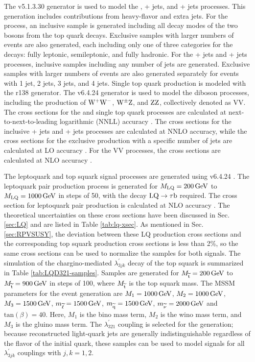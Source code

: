The \MADGRAPH v5.1.3.30 generator \cite{MadGraph} is used to model the \ttbar, \W + jets, and \Z + jets processes. This generation includes contributions from heavy-flavor and extra jets. For the \ttbar process, an inclusive sample is generated including all decay modes of the two \W bosons from the top quark decays. Exclusive samples with larger numbers of events are also generated, each including only one of three categories for the \W decays: fully leptonic, semileptonic, and fully hadronic. For the \W + jets and \Z + jets processes, inclusive samples including any number of jets are generated. Exclusive samples with larger numbers of events are also generated separately for events with 1 jet, 2 jets, 3 jets, and 4 jets. Single top quark production is modeled with the  r138 \cite{POWHEG2,POWHEG:singlet,POWHEG:singletW} generator. The \PYTHIA v6.4.24 generator \cite{Sjostrand:2006za} is used to model the diboson processes, including the production of $\mathrm{W}^{+}\mathrm{W}^{-}$, $\mathrm{W}^{\pm}\mathrm{Z}$, and $\mathrm{Z}\mathrm{Z}$, collectively denoted as VV. The cross sections for the \ttbar and single top quark processes are calculated at next-to-next-to-leading logarithmic (NNLL) accuracy \cite{TOPCrossSec}. The cross sections for the inclusive \W + jets and \Z + jets processes are calculated at NNLO accuracy, while the cross sections for the exclusive production with a specific number of jets are calculated at LO accuracy \cite{FEWZ}. For the VV processes, the cross sections are calculated at NLO accuracy \cite{MCFM}.

The leptoquark and top squark signal processes are generated using \PYTHIA v6.4.24 \cite{Sjostrand:2006za}. The leptoquark pair production process is generated for $M_{\text{LQ}}=200\,\text{Ge\hspace{-.08em}V}$ to $M_{\text{LQ}}=1000\,\text{Ge\hspace{-.08em}V}$ in steps of 50\GeV, with the decay $\text{LQ} \rightarrow \tau \mathrm{b}$ required. The cross section for leptoquark pair production is calculated at NLO accuracy \cite{LQxsec}. The theoretical uncertainties on these cross sections have been discussed in Sec. \ref{sec:LQ} and are listed in Table \ref{tab:lq-xsec}. As mentioned in Sec. \ref{sec:RPVSUSY}, the deviation between these LQ production cross sections and the corresponding top squark production cross sections is less than 2\%, so the same cross sections can be used to normalize the samples for both signals. The simulation of the chargino-mediated $\lambda_{3jk}^{\prime}$ decay of the top squark is summarized in Table \ref{tab:LQD321-samples}. Samples are generated for $M_{\widetilde{\mathrm{t}}}=200\,\text{Ge\hspace{-.08em}V}$ to $M_{\widetilde{\mathrm{t}}}=900\,\text{Ge\hspace{-.08em}V}$ in steps of 100\GeV, where $M_{\widetilde{\mathrm{t}}}$ is the top squark mass. The MSSM parameters for the event generation are $M_1=1000\,\text{Ge\hspace{-.08em}V}$, $M_2=1000\,\text{Ge\hspace{-.08em}V}$, $M_3=1500\,\text{Ge\hspace{-.08em}V}$, $m_{\widetilde{\mathrm{\ell}}}=1500\,\text{Ge\hspace{-.08em}V}$, $m_{\widetilde{\mathrm{q}}}=1500\,\text{Ge\hspace{-.08em}V}$, $m_{\widetilde{\nu}}=2000\,\text{Ge\hspace{-.08em}V}$ and $\text{tan}(\beta)=40$. Here, $M_1$ is the bino mass term, $M_2$ is the wino mass term, and $M_3$ is the gluino mass term. The $\lambda_{321}^{\prime}$ coupling is selected for the generation; because reconstructed light-quark jets are generally indistinguishable regardless of the flavor of the initial quark, these samples can be used to model signals for all $\lambda_{3jk}^{\prime}$ couplings with $j,k=1,2$.

